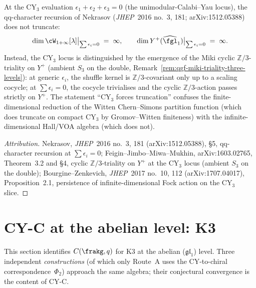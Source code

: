\begin{proposition}[No CY\texorpdfstring{$_3$}{-3} truncation at \texorpdfstring{$\sum\epsilon_i=0$}{sumeps-i=0}]
\label{prop:qgf-no-cy3-truncation}
At the CY$_3$ evaluation $\epsilon_1+\epsilon_2+\epsilon_3=0$ (the unimodular-Calabi--Yau locus), the qq-character recursion of Nekrasov (\emph{JHEP}\ 2016 no.\ 3, 181; arXiv:1512.05388) does not truncate:
\begin{equation}
\dim\cW_{1+\infty}[\lambda]\bigr|_{\sum\epsilon_i=0}\;=\;\infty,
\qquad
\dim Y^+(\widehat{\fgl}_1)\bigr|_{\sum\epsilon_i=0}\;=\;\infty.
\end{equation}
Instead, the CY$_3$ locus is distinguished by the emergence of the Miki cyclic $\mathbb{Z}/3$-triality on $Y^+$ (ambient $S_3$ on the double, Remark~\ref{rem:qgf-miki-triality-three-levels}): at generic $\epsilon_i$, the shuffle kernel is $\mathbb{Z}/3$-covariant only up to a scaling cocycle; at $\sum\epsilon_i=0$, the cocycle trivialises and the cyclic $\mathbb{Z}/3$-action passes strictly on $Y^+$. The statement ``CY$_3$ forces truncation'' confuses the finite-dimensional reduction of the Witten Chern--Simons partition function (which does truncate on compact CY$_3$ by Gromov--Witten finiteness) with the infinite-dimensional Hall/VOA algebra (which does not).
\end{proposition}

\begin{proof}[Attribution]
Nekrasov, \emph{JHEP}\ 2016 no.\ 3, 181 (arXiv:1512.05388), \S 5, qq-character recursion at $\sum\epsilon_i=0$; Feigin--Jimbo--Miwa--Mukhin, arXiv:1603.02765, Theorem~3.2 and \S 4, cyclic $\mathbb{Z}/3$-triality on $Y^+$ at the CY$_3$ locus (ambient $S_3$ on the double); Bourgine--Zenkevich, \emph{JHEP}\ 2017 no.\ 10, 112 (arXiv:1707.04017), Proposition~2.1, persistence of infinite-dimensional Fock action on the CY$_3$ slice.
\end{proof}

\section{CY-C at the abelian level: K3}
\label{sec:qgf-cy-c-k3-abelian}

This section identifies $C(\frakg, q)$ for $\text{K3}$ at the abelian ($\mathfrak{gl}_1$) level. Three independent \emph{constructions} (of which only Route~A uses the CY-to-chiral correspondence~$\Phi_2$) approach the same algebra; their conjectural convergence is the content of CY-C.

